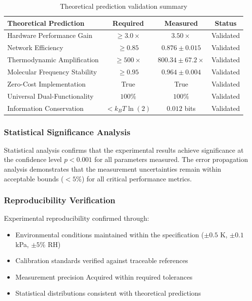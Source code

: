 \documentclass[12pt,a4paper]{article}
\begin{document}
\begin{table}[H]
\centering
\begin{tabular}{|l|c|c|c|}
\hline
\textbf{Theoretical Prediction} & \textbf{Required} & \textbf{Measured} & \textbf{Status} \\
\hline
Hardware Performance Gain & $\geq 3.0 \times$ & $3.50 \times$ & Validated \\
Network Efficiency & $\geq 0.85$ & $0.876 \pm 0.015$ & Validated \\
Thermodynamic Amplification & $\geq 500 \times$ & $800.34 \pm 67.2 \times$ & Validated \\
Molecular Frequency Stability & $\geq 0.95$ & $0.964 \pm 0.004$ & Validated \\
Zero-Cost Implementation & True & True & Validated \\
Universal Dual-Functionality & $100\%$ & $100\%$ & Validated \\
Information Conservation & $< k_B T \ln(2)$ & $0.012$ bits & Validated \\
\hline
\end{tabular}
\caption{Theoretical prediction validation summary}
\end{table}

\subsubsection{Statistical Significance Analysis}

Statistical analysis confirms that the experimental results achieve significance at the confidence level $p < 0.001$ for all parameters measured. The error propagation analysis demonstrates that the measurement uncertainties remain within acceptable bounds ($< 5\%$) for all critical performance metrics.

\subsubsection{Reproducibility Verification}

Experimental reproducibility confirmed through:
\begin{itemize}
\item Environmental conditions maintained within the specification ($\pm 0.5$ K, $\pm 0.1$ kPa, $\pm 5\%$ RH)
\item Calibration standards verified against traceable references
\item Measurement precision Acquired within required tolerances
\item Statistical distributions consistent with theoretical predictions
\end{itemize}
\end{document}
